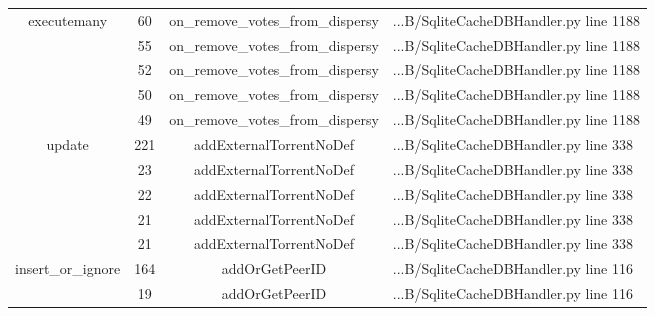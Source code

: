 \begin{table}[!h]
{\begin{tabular}{|c|c|c|l|}
		\multicolumn{1}{|c|}{\multirow{5}{*}{executemany}} & \multicolumn{1}{c|}{60} & \multicolumn{1}{c|}{on\_remove\_votes\_from\_dispersy} & \multicolumn{1}{l|}{...B/SqliteCacheDBHandler.py line 1188} \\ \cline{2-4}
		\multicolumn{1}{|c|}{} & \multicolumn{1}{c|}{55}  & \multicolumn{1}{c|}{on\_remove\_votes\_from\_dispersy}  & \multicolumn{1}{l|}{...B/SqliteCacheDBHandler.py line 1188}  \\ \cline{2-4} 
		\multicolumn{1}{|c|}{} & \multicolumn{1}{c|}{52}  & \multicolumn{1}{c|}{on\_remove\_votes\_from\_dispersy}  & \multicolumn{1}{l|}{...B/SqliteCacheDBHandler.py line 1188}  \\ \cline{2-4} 
		\multicolumn{1}{|c|}{} & \multicolumn{1}{c|}{50}  & \multicolumn{1}{c|}{on\_remove\_votes\_from\_dispersy}  & \multicolumn{1}{l|}{...B/SqliteCacheDBHandler.py line 1188}  \\ \cline{2-4} 
		\multicolumn{1}{|c|}{} & \multicolumn{1}{c|}{49}  & \multicolumn{1}{c|}{on\_remove\_votes\_from\_dispersy}  & \multicolumn{1}{l|}{...B/SqliteCacheDBHandler.py line 1188}  \\ \hline 
		\multicolumn{1}{|c|}{\multirow{5}{*}{update}} & \multicolumn{1}{c|}{221} & \multicolumn{1}{c|}{addExternalTorrentNoDef} & \multicolumn{1}{l|}{...B/SqliteCacheDBHandler.py line 338} \\ \cline{2-4}
		\multicolumn{1}{|c|}{} & \multicolumn{1}{c|}{23}  & \multicolumn{1}{c|}{addExternalTorrentNoDef}  & \multicolumn{1}{l|}{...B/SqliteCacheDBHandler.py line 338}  \\ \cline{2-4} 
		\multicolumn{1}{|c|}{} & \multicolumn{1}{c|}{22}  & \multicolumn{1}{c|}{addExternalTorrentNoDef}  & \multicolumn{1}{l|}{...B/SqliteCacheDBHandler.py line 338}  \\ \cline{2-4} 
		\multicolumn{1}{|c|}{} & \multicolumn{1}{c|}{21}  & \multicolumn{1}{c|}{addExternalTorrentNoDef}  & \multicolumn{1}{l|}{...B/SqliteCacheDBHandler.py line 338}  \\ \cline{2-4} 
		\multicolumn{1}{|c|}{} & \multicolumn{1}{c|}{21}  & \multicolumn{1}{c|}{addExternalTorrentNoDef}  & \multicolumn{1}{l|}{...B/SqliteCacheDBHandler.py line 338}  \\ \hline 
		\multicolumn{1}{|c|}{\multirow{5}{*}{insert\_or\_ignore}} & \multicolumn{1}{c|}{164} & \multicolumn{1}{c|}{addOrGetPeerID} & \multicolumn{1}{l|}{...B/SqliteCacheDBHandler.py line 116} \\ \cline{2-4}
		\multicolumn{1}{|c|}{} & \multicolumn{1}{c|}{19}  & \multicolumn{1}{c|}{addOrGetPeerID}  & \multicolumn{1}{l|}{...B/SqliteCacheDBHandler.py line 116}  \\ \cline{2-4} 

\end{tabular}}
\end{table}
